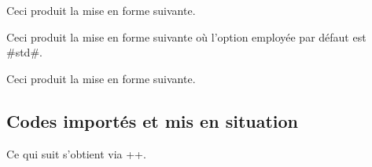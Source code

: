 

\begin{tdocexa}
    \leavevmode

    \begin{tdoclatex}[code]

    \end{tdoclatex}

    Ceci produit la mise en forme suivante.


\end{tdocexa}




\begin{tdocexa}[À la suite]
    \leavevmode

    \begin{tdoclatex}[code]

    \end{tdoclatex}

    Ceci produit la mise en forme suivante où l'option employée par défaut est \tdocinlatex#std#.


\end{tdocexa}




\begin{tdocexa}
    \leavevmode

    \begin{tdoclatex}[code]

    \end{tdoclatex}

    Ceci produit la mise en forme suivante.


\end{tdocexa}




\subsection{Codes importés et mis en situation} \label{tdoc-latexshow}

\begin{tdocexa}[Showcase]
    Ce qui suit s'obtient via \tdocinlatex++.

    \medskip

    \begin{tdoc-doc-showcase}

    \end{tdoc-doc-showcase}
\end{tdocexa}


